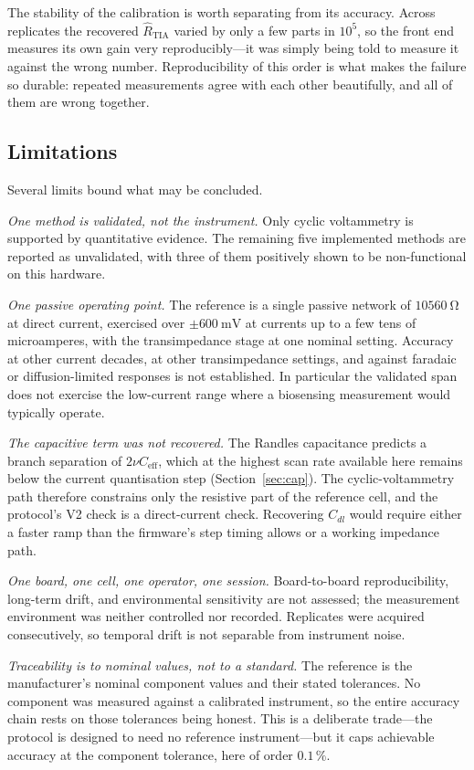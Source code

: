 The stability of the calibration is worth separating from its accuracy. Across
replicates the recovered $\hat{R}_{\mathrm{TIA}}$ varied by only a few parts in
$10^{5}$, so the front end measures its own gain very reproducibly---it was
simply being told to measure it against the wrong number. Reproducibility of
this order is what makes the failure so durable: repeated measurements agree
with each other beautifully, and all of them are wrong together.

\subsection{Limitations}
\label{sec:limitations}

Several limits bound what may be concluded.

\emph{One method is validated, not the instrument.} Only cyclic voltammetry is
supported by quantitative evidence. The remaining five implemented methods are
reported as unvalidated, with three of them positively shown to be
non-functional on this hardware.

\emph{One passive operating point.} The reference is a single passive network of
$\SI{10560}{\ohm}$ at direct current, exercised over $\pm\SI{600}{\milli\volt}$ at
currents up to a few tens of microamperes, with the transimpedance stage at one
nominal setting. Accuracy at other current decades, at other transimpedance
settings, and against faradaic or diffusion-limited responses is not
established. In particular the validated span does not exercise the low-current
range where a biosensing measurement would typically operate.

\emph{The capacitive term was not recovered.} The Randles capacitance predicts a
branch separation of $2\nu C_{\mathrm{eff}}$, which at the highest scan rate
available here remains below the current quantisation step
(Section~\ref{sec:cap}). The cyclic-voltammetry path therefore constrains only
the resistive part of the reference cell, and the protocol's V2 check is a
direct-current check. Recovering $C_{dl}$ would require either a faster ramp
than the firmware's step timing allows or a working impedance path.

\emph{One board, one cell, one operator, one session.} Board-to-board
reproducibility, long-term drift, and environmental sensitivity are not
assessed; the measurement environment was neither controlled nor recorded.
Replicates were acquired consecutively, so temporal drift is not separable from
instrument noise.

\emph{Traceability is to nominal values, not to a standard.} The reference is
the manufacturer's nominal component values and their stated tolerances. No
component was measured against a calibrated instrument, so the entire accuracy
chain rests on those tolerances being honest. This is a deliberate trade---the
protocol is designed to need no reference instrument---but it caps achievable
accuracy at the component tolerance, here of order $0.1\,\%$.
